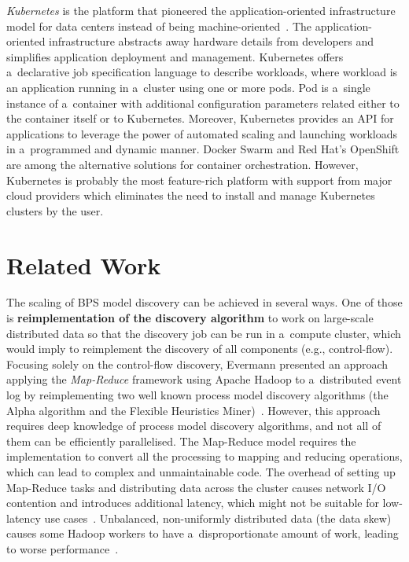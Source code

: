 \documentclass[12pt]{article}
\begin{document}
\emph{Kubernetes} is the platform that pioneered the application-oriented infrastructure model for data centers instead of being machine-oriented~\cite{burns_borg_2016}.
The application-oriented infrastructure abstracts away hardware details from developers and simplifies application deployment and management.
Kubernetes offers a~declarative job specification language to describe workloads, where workload is an application running in a~cluster using one or more pods.
Pod is a~single instance of a~container with additional configuration parameters related either to the container itself or to Kubernetes.
Moreover, Kubernetes provides an API for applications to leverage the power of automated scaling and launching workloads in a~programmed and dynamic manner.
Docker Swarm and Red Hat's OpenShift are among the alternative solutions for container orchestration. 
However, Kubernetes is probably the most feature-rich platform with support from major cloud providers which eliminates the need to install and manage Kubernetes clusters by the user.


\newpage
\section{Related Work} \label{ch:related_work}

The scaling of BPS model discovery can be achieved in several ways. One of those is \textbf{reimplementation of the discovery algorithm} to work on large-scale distributed data so that the discovery job can be run in a~compute cluster, which would imply to reimplement the discovery of all components (e.g., control-flow). Focusing solely on the control-flow discovery, Evermann presented an approach applying the \emph{Map-Reduce} framework using Apache Hadoop to a~distributed event log by reimplementing two well known process model discovery algorithms (the Alpha algorithm and the Flexible Heuristics Miner)~\cite{evermann_scalable_2016}. However, this approach requires deep knowledge of process model discovery algorithms, and not all of them can be efficiently parallelised. The Map-Reduce model requires the implementation to convert all the processing to mapping and reducing operations, which can lead to complex and unmaintainable code. The overhead of setting up Map-Reduce tasks and distributing data across the cluster causes network I/O contention and introduces additional latency, which might not be suitable for low-latency use cases~\cite{weets_limitations_2015}. Unbalanced, non-uniformly distributed data (the data skew) causes some Hadoop workers to have a~disproportionate amount of work, leading to worse performance~\cite{weets_limitations_2015}.
\end{document}
